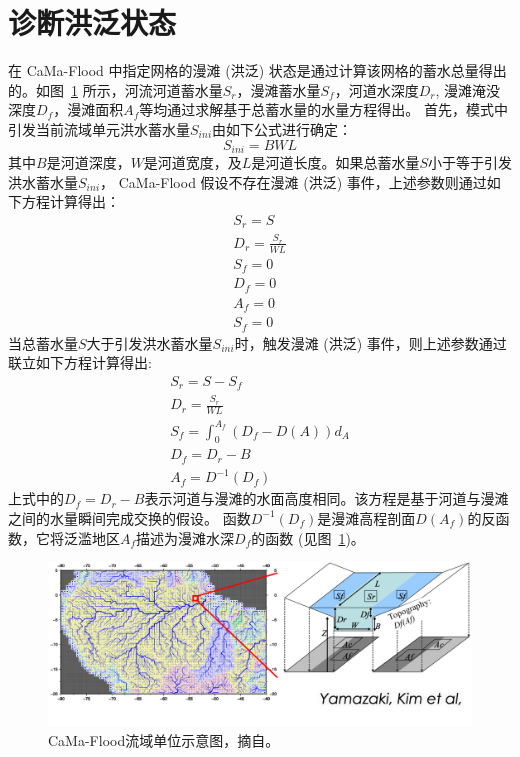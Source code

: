 \section{诊断洪泛状态}\label{诊断洪泛状态}
在 CaMa-Flood 中指定网格的漫滩 (洪泛) 状态是通过计算该网格的蓄水总量得出的。如图~\ref{fig:CaMa-Flood流域单位示意图}
所示，河流河道蓄水量$S_r$，漫滩蓄水量$S_f$，河道水深度$D_r$, 漫滩淹没深度$D_f$，漫滩面积$A_f$等均通过求解基于总蓄水量的水量方程得出。
首先，模式中引发当前流域单元洪水蓄水量$S_{ini}$由如下公式进行确定：
\begin{equation}
S_{ ini }=B WL
\end{equation}
其中$B$是河道深度，$W$是河道宽度，及$L$是河道长度。如果总蓄水量$S$小于等于引发洪水蓄水量$S_{ini}$，
CaMa-Flood 假设不存在漫滩 (洪泛) 事件，上述参数则通过如下方程计算得出：
\begin{equation}
    \begin{array}{l}S_r=S \\ D_r=\frac{S_r}{WL} \\ S_f=0 \\ D_f=0 \\ A_f=0 \\ S_f=0\end{array}
\end{equation}
当总蓄水量$S$大于引发洪水蓄水量$S_{ini}$时，触发漫滩 (洪泛) 事件，则上述参数通过联立如下方程计算得出:
\begin{equation}
\begin{array}{l}S_r=S-S_f \\ D_r=\frac{S_r}{W L} \\ S_f=\int_{0}^{A_f}(D_f-D(A)) d_A \\ D_f=D_r-B \\ A_f=D^{-1}(D_f)\end{array}
\end{equation}
上式中的$D_f = D_r - B$表示河道与漫滩的水面高度相同。该方程是基于河道与漫滩之间的水量瞬间完成交换的假设。
函数$D^{-1}(D_f)$是漫滩高程剖面$D(A_f)$的反函数，它将泛滥地区$A_f$描述为漫滩水深$D_f$的函数 (见图~\ref{fig:CaMa-Flood流域单位示意图})。


{
\begin{figure}[htbp]
\centering
\includegraphics{Figures/陆地表面的水分循环/CaMa-Flood流域单位示意图.png}
\caption{CaMa-Flood流域单位示意图，摘自\citet{yamazaki2011physically}。 }
\label{fig:CaMa-Flood流域单位示意图}
\end{figure}
}

